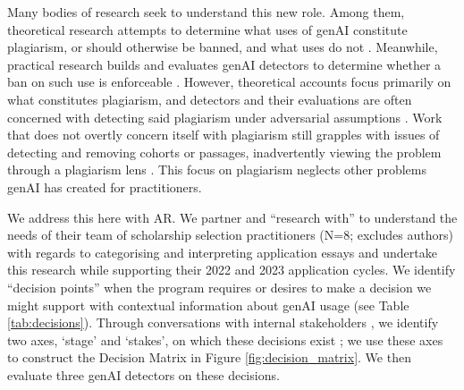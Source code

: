 Many bodies of research seek to understand this new role. Among them, theoretical research attempts to determine what uses of genAI constitute plagiarism, or should otherwise be banned, and what uses do not \cite{yu_huang_reflection_2023,MikePerkins_JasperRoe_2023}. Meanwhile, practical research builds and evaluates genAI detectors to determine whether a ban on such use is enforceable \cite{mitchell_detectgpt_2023,tharindu_kumarage_stylometric_2023,kalpesh_krishna_paraphrasing_2023}. However, theoretical accounts focus primarily on what constitutes plagiarism, and detectors and their evaluations are often concerned with detecting said plagiarism under adversarial assumptions \cite{yu_huang_reflection_2023,kalpesh_krishna_paraphrasing_2023}. Work that does not overtly concern itself with plagiarism still grapples with issues of detecting and removing cohorts or passages, inadvertently viewing the problem through a plagiarism lens \cite{mitchell_detectgpt_2023,liang_gpt_2023}. This focus on plagiarism neglects other problems genAI has created for practitioners.

We address this here with AR. We partner and ``research with'' \cite{bradbury_action_2003} \rise to understand the needs of their team of scholarship selection practitioners (N=8; excludes authors) with regards to categorising and interpreting application essays and undertake this research while supporting their 2022 and 2023 application cycles. We identify ``decision points'' when the program requires or desires to make a decision we might support with contextual information about genAI usage (see Table \ref{tab:decisions}). Through conversations with internal stakeholders \cite{Hayes_2011}, we identify two axes, `stage' and `stakes', on which these decisions exist \cite{braun_using_2006}; we use these axes to construct the Decision Matrix in Figure \ref{fig:decision_matrix}. We then evaluate three genAI detectors on these decisions.

